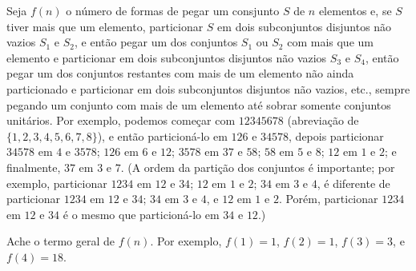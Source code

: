 Seja $f(n)$ o número de formas de pegar um consjunto $S$ de $n$ elementos e, se $S$ tiver mais que um elemento, particionar $S$ em dois subconjuntos disjuntos não vazios $S_1$ e $S_2$, e então pegar um dos conjuntos $S_1$ ou $S_2$ com mais que um elemento e particionar em dois subconjuntos disjuntos não  vazios $S_3$ e $S_4$, então pegar um dos conjuntos restantes com mais de um elemento não ainda particionado e particionar em dois subconjuntos disjuntos não vazios, etc., sempre pegando um conjunto com mais de um elemento até sobrar somente conjuntos unitários.
Por exemplo, podemos começar com $12345678$ (abreviação de $\{1, 2, 3, 4, 5, 6, 7, 8\}$), e então particioná-lo em $126$ e $34578$, depois particionar $34578$ em $4$ e $3578$; $126$ em $6$ e $12$; $3578$ em $37$ e $58$; $58$ em $5$ e $8$; $12$ em $1$ e $2$; e finalmente, $37$ em $3$ e $7$.
(A ordem da partição dos conjuntos é importante; por exemplo, particionar $1234$ em $12$ e $34$; $12$ em $1$ e $2$; $34$ em $3$ e $4$, é diferente de particionar $1234$ em $12$ e $34$; $34$ em $3$ e $4$, e $12$ em $1$ e $2$.
Porém, particionar $1234$ em $12$ e $34$ é o mesmo que particioná-lo em $34$ e $12$.)

Ache o termo geral de $f(n)$. Por exemplo, $f(1) = 1$, $f(2) = 1$, $f(3) = 3$, e $f (4) = 18$.
